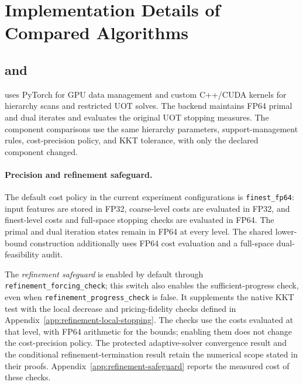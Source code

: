 \section{Implementation Details of Compared Algorithms}
\label{app:implementation-details}

\subsection{\ours and \subsolver}
\label{app:implementation-shuttle}
\ours uses PyTorch for GPU data management and custom C++/CUDA kernels for hierarchy scans and restricted UOT solves.
The \subsolver backend maintains FP64 primal and dual iterates and evaluates the original UOT stopping measures.
The component comparisons use the same hierarchy parameters, support-management rules, cost-precision policy, and KKT tolerance, with only the declared component changed.

\paragraph{Precision and refinement safeguard.}
The default cost policy in the current \ours experiment configurations is \texttt{finest\_fp64}: input features are stored in FP32, coarse-level costs are evaluated in FP32, and finest-level costs and full-space stopping checks are evaluated in FP64.
The primal and dual iteration states remain in FP64 at every level.
The shared lower-bound construction additionally uses FP64 cost evaluation and a full-space dual-feasibility audit.

The \emph{refinement safeguard} is enabled by default through \texttt{refinement\_forcing\_check}; this switch also enables the sufficient-progress check, even when \texttt{refinement\_progress\_check} is false.
It supplements the native KKT test with the local decrease and pricing-fidelity checks defined in Appendix~\ref{app:refinement-local-stopping}.
The checks use the costs evaluated at that level, with FP64 arithmetic for the bounds; enabling them does not change the cost-precision policy.
The protected adaptive-solver convergence result and the conditional refinement-termination result retain the numerical scope stated in their proofs.
Appendix~\ref{app:refinement-safeguard} reports the measured cost of these checks.

